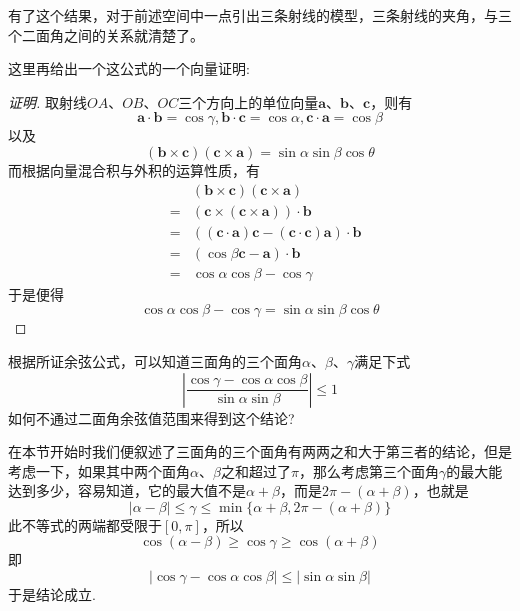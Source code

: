 有了这个结果，对于前述空间中一点引出三条射线的模型，三条射线的夹角，与三个二面角之间的关系就清楚了。

这里再给出一个这公式的一个向量证明:
\begin{proof}[证明]
  取射线$OA$、$OB$、$OC$三个方向上的单位向量$\bm a$、$\bm b$、$\bm c$，则有
  \[ \bm a\cdot \bm b=\cos{\gamma}, \bm b \cdot \bm c = \cos{\alpha}, \bm c \cdot \bm a = \cos{\beta} \]
  以及
  \[ (\bm b\times \bm c)(\bm c \times \bm a) = \sin{\alpha}\sin{\beta}\cos{\theta} \]
  而根据向量混合积与外积的运算性质，有
  \begin{eqnarray*}
    && (\bm b\times \bm c)(\bm c \times \bm a) \\
    & = & (\bm c \times (\bm c \times \bm a)) \cdot \bm b \\
    & = & ((\bm c \cdot \bm a) \bm c - ( \bm c \cdot \bm c) \bm a) \cdot \bm b \\
    & = & (\cos{\beta} \bm c - \bm a) \cdot \bm b \\
    & = & \cos{\alpha}\cos{\beta}-\cos{\gamma}
  \end{eqnarray*}
  于是便得
  \[ \cos{\alpha}\cos{\beta}-\cos{\gamma} = \sin{\alpha}\sin{\beta}\cos{\theta} \]
\end{proof}

\begin{example}
  根据所证余弦公式，可以知道三面角的三个面角$\alpha$、$\beta$、$\gamma$满足下式
  \[ \left| \frac{\cos{\gamma}-\cos{\alpha}\cos{\beta}}{\sin{\alpha}\sin{\beta}} \right| \leqslant 1 \]
  如何不通过二面角余弦值范围来得到这个结论?

  在本节开始时我们便叙述了三面角的三个面角有两两之和大于第三者的结论，但是考虑一下，如果其中两个面角$\alpha$、$\beta$之和超过了$\pi$，那么考虑第三个面角$\gamma$的最大能达到多少，容易知道，它的最大值不是$\alpha+\beta$，而是$2\pi-(\alpha+\beta)$，也就是
  \[ |\alpha-\beta| \leqslant \gamma \leqslant \min\{\alpha+\beta,2\pi-(\alpha+\beta)\} \]
  此不等式的两端都受限于$[0,\pi]$，所以
  \[ \cos{(\alpha-\beta)} \geqslant \cos{\gamma} \geqslant \cos{(\alpha+\beta)} \]
即
\[ |\cos{\gamma}-\cos{\alpha}\cos{\beta}| \leqslant |\sin{\alpha}\sin{\beta}| \]
于是结论成立.
\end{example}

